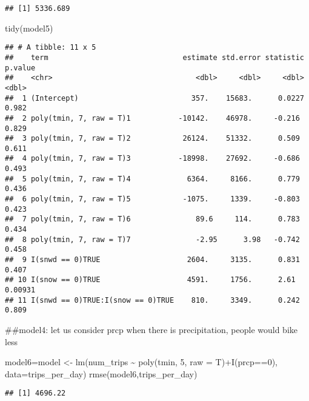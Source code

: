 \documentclass[
]{article}
\newenvironment{Shaded}{\begin{snugshade}}{\end{snugshade}}
\newcommand{\AttributeTok}[1]{\textcolor[rgb]{0.77,0.63,0.00}{#1}}
\newcommand{\DecValTok}[1]{\textcolor[rgb]{0.00,0.00,0.81}{#1}}
\newcommand{\FunctionTok}[1]{\textcolor[rgb]{0.00,0.00,0.00}{#1}}
\newcommand{\NormalTok}[1]{#1}
\newcommand{\OtherTok}[1]{\textcolor[rgb]{0.56,0.35,0.01}{#1}}
\newcommand{\SpecialCharTok}[1]{\textcolor[rgb]{0.00,0.00,0.00}{#1}}
\begin{document}
\begin{verbatim}
## [1] 5336.689
\end{verbatim}

\begin{Shaded}
\begin{Highlighting}[]
\FunctionTok{tidy}\NormalTok{(model5)}
\end{Highlighting}
\end{Shaded}

\begin{verbatim}
## # A tibble: 11 x 5
##    term                               estimate std.error statistic p.value
##    <chr>                                 <dbl>     <dbl>     <dbl>   <dbl>
##  1 (Intercept)                          357.    15683.      0.0227 0.982  
##  2 poly(tmin, 7, raw = T)1           -10142.    46978.     -0.216  0.829  
##  3 poly(tmin, 7, raw = T)2            26124.    51332.      0.509  0.611  
##  4 poly(tmin, 7, raw = T)3           -18998.    27692.     -0.686  0.493  
##  5 poly(tmin, 7, raw = T)4             6364.     8166.      0.779  0.436  
##  6 poly(tmin, 7, raw = T)5            -1075.     1339.     -0.803  0.423  
##  7 poly(tmin, 7, raw = T)6               89.6     114.      0.783  0.434  
##  8 poly(tmin, 7, raw = T)7               -2.95      3.98   -0.742  0.458  
##  9 I(snwd == 0)TRUE                    2604.     3135.      0.831  0.407  
## 10 I(snow == 0)TRUE                    4591.     1756.      2.61   0.00931
## 11 I(snwd == 0)TRUE:I(snow == 0)TRUE    810.     3349.      0.242  0.809
\end{verbatim}

\#\#model4: let us consider prcp when there is precipitation, people
would bike less

\begin{Shaded}
\begin{Highlighting}[]
\NormalTok{model6}\OtherTok{=}\NormalTok{model }\OtherTok{\textless{}{-}} \FunctionTok{lm}\NormalTok{(num\_trips }\SpecialCharTok{\textasciitilde{}} \FunctionTok{poly}\NormalTok{(tmin, }\DecValTok{5}\NormalTok{, }\AttributeTok{raw =}\NormalTok{ T)}\SpecialCharTok{+}\FunctionTok{I}\NormalTok{(prcp}\SpecialCharTok{==}\DecValTok{0}\NormalTok{), }\AttributeTok{data=}\NormalTok{trips\_per\_day)}
\FunctionTok{rmse}\NormalTok{(model6,trips\_per\_day)}
\end{Highlighting}
\end{Shaded}

\begin{verbatim}
## [1] 4696.22
\end{verbatim}
\end{document}

